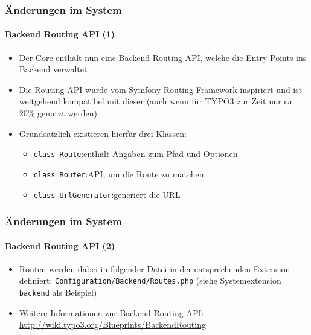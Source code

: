 \begin{frame}[fragile]
	\frametitle{Änderungen im System}
	\framesubtitle{Backend Routing API (1)}

	\begin{itemize}
		\item Der Core enthält nun eine Backend Routing API, welche die Entry Points ins Backend verwaltet
		\item Die Routing API wurde vom Symfony Routing Framework inspiriert und ist weitgehend kompatibel mit dieser\newline
			\small(auch wenn für TYPO3 zur Zeit nur ca. 20\% genutzt werden)\normalsize

		\item Grundsätzlich existieren hierfür drei Klassen:
			\begin{itemize}
				\item \texttt{class Route}:\tabto{3.6cm}enthält Angaben zum Pfad und Optionen
				\item \texttt{class Router}:\tabto{3.6cm}API, um die Route zu matchen
				\item \texttt{class UrlGenerator}:\tabto{3.6cm}generiert die URL
			\end{itemize}
	\end{itemize}

\end{frame}

\begin{frame}[fragile]
	\frametitle{Änderungen im System}
	\framesubtitle{Backend Routing API (2)}

	\begin{itemize}

		\item Routen werden dabei in folgender Datei in der entsprechenden Extension definiert:
			\texttt{Configuration/Backend/Routes.php}\newline
			\small(siehe Systemextension \texttt{backend} als Beispiel)\normalsize

		\item Weitere Informationen zur Backend Routing API:\newline
			\small\url{http://wiki.typo3.org/Blueprints/BackendRouting}\normalsize

	\end{itemize}

\end{frame}

